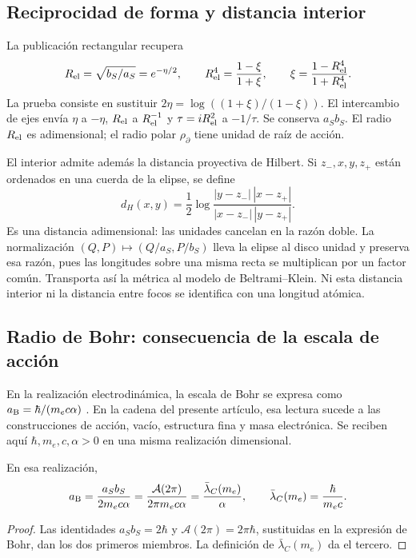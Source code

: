 \subsection{Reciprocidad de forma y distancia interior}

La publicación rectangular recupera
\begin{equation}
 R_{\rm el}=\sqrt{b_S/a_S}=e^{-\eta/2},\qquad
 R_{\rm el}^4=\frac{1-\xi}{1+\xi},\qquad
 \xi=\frac{1-R_{\rm el}^4}{1+R_{\rm el}^4}.
 \label{ii:eq:ii-elipse-reciproca}
\end{equation}
La prueba consiste en sustituir
\(2\eta=\log((1+\xi)/(1-\xi))\). El intercambio de ejes
envía \(\eta\) a \(-\eta\), \(R_{\rm el}\) a
\(R_{\rm el}^{-1}\) y \(\tau=iR_{\rm el}^2\) a \(-1/\tau\).
Se conserva \(a_Sb_S\). El radio \(R_{\rm el}\) es adimensional;
el radio polar \(\rho_{\partial}\) tiene unidad de raíz de acción.

El interior admite además la distancia proyectiva de Hilbert. Si
\(z_-,x,y,z_+\) están ordenados en una cuerda de la elipse, se define
\[
 d_H(x,y)=\frac12\log
 \frac{|y-z_-|\,|x-z_+|}{|x-z_-|\,|y-z_+|}.
\]
Es una distancia adimensional: las unidades cancelan en la razón doble.
La normalización \((Q,P)\mapsto(Q/a_S,P/b_S)\) lleva la elipse
al disco unidad y preserva esa razón, pues las longitudes sobre una
misma recta se multiplican por un factor común. Transporta así la métrica
al modelo de Beltrami--Klein. Ni esta distancia interior ni la distancia
entre focos se identifica con una longitud atómica.

\subsection{Radio de Bohr: consecuencia de la escala de acción}
\label{ii:sec:ii-elipse-bohr}

En la realización electrodinámica, la escala de Bohr se expresa como
\(a_{\rm B}=\hbar/(m_ec\alpha)\) \cite{ii:codata2022}. En la cadena
del presente artículo, esa lectura sucede a las construcciones de
acción, vacío, estructura fina y masa electrónica. Se reciben aquí
\(\hbar,m_e,c,\alpha>0\) en una misma realización dimensional.
\begin{proposition}
\label{ii:prop:ii-elipse-bohr}
En esa realización,
\begin{equation}
 a_{\rm B}=\frac{a_Sb_S}{2m_ec\alpha}
 =\frac{\mathcal A(2\pi)}{2\pi m_ec\alpha}
 =\frac{\bar\lambda_C(m_e)}{\alpha},\qquad
 \bar\lambda_C(m_e)=\frac{\hbar}{m_ec}.
 \label{ii:eq:ii-elipse-bohr}
\end{equation}
\end{proposition}
\begin{proof}
Las identidades \(a_Sb_S=2\hbar\) y
\(\mathcal A(2\pi)=2\pi\hbar\), sustituidas en la expresión
de Bohr, dan los dos primeros miembros. La definición de
\(\bar\lambda_C(m_e)\) da el tercero.
\end{proof}

